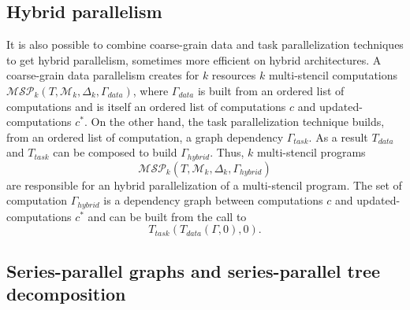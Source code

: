 \subsection{Hybrid parallelism}
It is also possible to combine coarse-grain data and task parallelization techniques to get hybrid parallelism, sometimes more efficient on hybrid architectures. A coarse-grain data parallelism creates for $k$ resources $k$ multi-stencil computations $\mathcal{MSP}_k(T,\mathcal{M}_k,\Delta_k,\Gamma_{data})$, where $\Gamma_{data}$ is built from an ordered list of computations and is itself an ordered list of computations $c$ and updated-computations $c^*$. On the other hand, the task parallelization technique builds, from an ordered list of computation, a graph dependency $\Gamma_{task}$. As a result $T_{data}$ and $T_{task}$ can be composed to build $\Gamma_{hybrid}$. Thus, $k$ multi-stencil programs
\begin{equation*}
\mathcal{MSP}_k(T,\mathcal{M}_k,\Delta_k,\Gamma_{hybrid})
\end{equation*}
are responsible for an hybrid parallelization of a multi-stencil program. The set of computation $\Gamma_{hybrid}$ is a dependency graph between computations $c$ and updated-computations $c^*$ and can be built from the call to 
\begin{equation*}
T_{task}(T_{data}(\Gamma,0),0).
\end{equation*}

\subsection{Series-parallel graphs and series-parallel tree decomposition}

